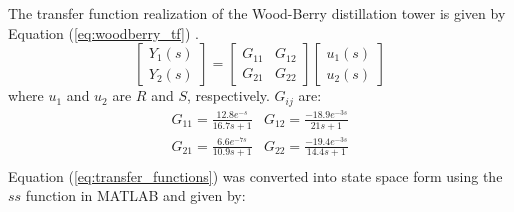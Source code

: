 The transfer function realization of the Wood-Berry distillation tower is given by Equation (\ref{eq:woodberry_tf}) \cite{woodberry_ref15}.
\begin{equation}
    \begin{bmatrix}
        Y_1(s) \\
        Y_2(s) 
    \end{bmatrix}
    =
    \begin{bmatrix}
        G_{11}  & G_{12} \\
        G_{21}  & G_{22}
    \end{bmatrix}
    \begin{bmatrix}
        u_1(s) \\
        u_2(s)
    \end{bmatrix}
\label{eq:woodberry_tf}
\end{equation}
where $u_1$ and $u_2$ are $R$ and $S$, respectively. $G_{ij}$ are: \\
\begin{equation}
    \begin{matrix}
        G_{11} = \frac{12.8e^{-s}}{16.7s + 1}     &     G_{12} = \frac{-18.9e^{-3s}}{21s + 1} \\
        G_{21} = \frac{6.6e^{-7s}}{10.9s + 1}     &     G_{22} = \frac{-19.4e^{-3s}}{14.4s + 1} \\
    \end{matrix}
    \label{eq:transfer_functions}
\end{equation}
Equation (\ref{eq:transfer_functions}) was converted into state space form using the $ss$ function in MATLAB and given by:

